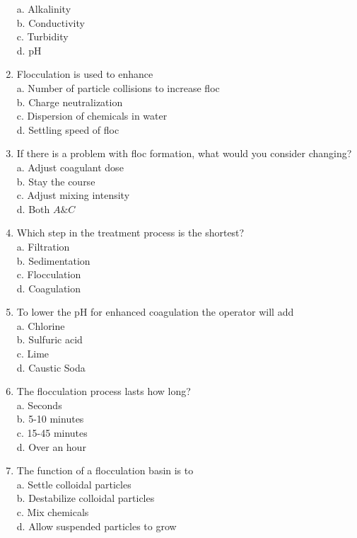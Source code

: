 \begin{enumerate}
a. Alkalinity\\
b. Conductivity\\
c. Turbidity\\
d. $\mathrm{pH}$\\
\item Flocculation is used to enhance\\
a. Number of particle collisions to increase floc\\
b. Charge neutralization\\
c. Dispersion of chemicals in water\\
d. Settling speed of floc\\
\item If there is a problem with floc formation, what would you consider changing?\\
a. Adjust coagulant dose\\
b. Stay the course\\
c. Adjust mixing intensity\\
d. Both $A \& C$\\
\item Which step in the treatment process is the shortest?\\
a. Filtration\\
b. Sedimentation\\
c. Flocculation\\
d. Coagulation\\
\item To lower the $\mathrm{pH}$ for enhanced coagulation the operator will add\\
a. Chlorine\\
b. Sulfuric acid\\
c. Lime\\
d. Caustic Soda\\
\item The flocculation process lasts how long?\\
a. Seconds\\
b. 5-10 minutes\\
c. 15-45 minutes\\
d. Over an hour\\
\item The function of a flocculation basin is to\\
a. Settle colloidal particles\\
b. Destabilize colloidal particles\\
c. Mix chemicals\\
d. Allow suspended particles to grow\\

\end{enumerate}
